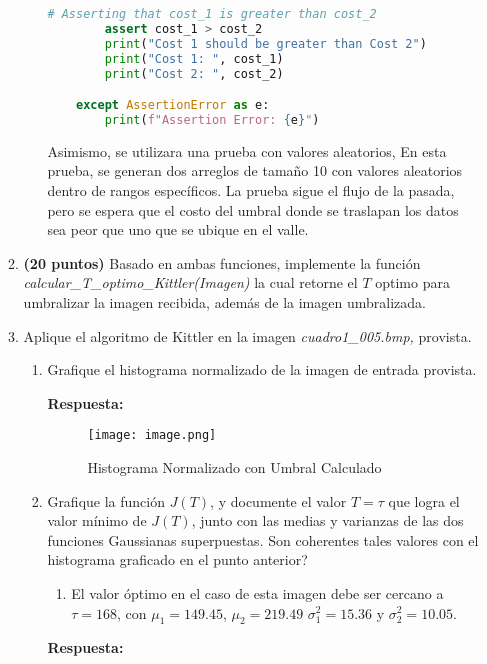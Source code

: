 \documentclass[spanish]{article}
\begin{document}
\begin{enumerate}
\begin{enumerate}
\begin{enumerate}
\begin{lstlisting}[language=Python, caption=Pruebas Unitarias]
        # Asserting that cost_1 is greater than cost_2
        assert cost_1 > cost_2
        print("Cost 1 should be greater than Cost 2")
        print("Cost 1: ", cost_1)
        print("Cost 2: ", cost_2)

    except AssertionError as e:
        print(f"Assertion Error: {e}")
\end{lstlisting}

\vspace{5px}

\par  Asimismo, se utilizara una prueba con valores aleatorios, En esta prueba, se generan dos arreglos de tamaño 10  con valores aleatorios dentro de rangos específicos. La prueba sigue el flujo de la pasada, pero se espera que el costo del umbral donde se traslapan los datos sea peor que uno que se ubique en el valle.

\newpage
\end{enumerate}
\item \textbf{(20 puntos)} Basado en ambas funciones, implemente la función
\emph{calcular\_T\_optimo\_Kittler(Imagen) }la cual retorne el $T$
optimo para umbralizar la imagen recibida, además de la imagen umbralizada. 
\item Aplique el algoritmo de Kittler en la imagen \emph{cuadro1\_005.bmp,
}provista.


\begin{enumerate}
\item Grafique el histograma normalizado de la imagen de entrada provista.
\par \textbf{Respuesta:}
\begin{figure}[h]
    \centering
    \texttt{[image: image.png]}
    \caption{Histograma Normalizado con Umbral Calculado}
    \label{fig:enter-label}
\end{figure}
\item Grafique la función $J(T)$, y documente el valor $T=\tau$ que logra
el valor mínimo de $J(T)$, junto con las medias y varianzas de las
dos funciones Gaussianas superpuestas. Son coherentes tales valores
con el histograma graficado en el punto anterior?
\begin{enumerate}
\item El valor óptimo en el caso de esta imagen debe ser cercano a $\tau=168$,
con $\mu_{1}=149.45$, $\mu_{2}=219.49$ $\sigma_{1}^{2}=15.36$ y
$\sigma_{2}^{2}=10.05$.
\end{enumerate}
\par \textbf{Respuesta:}


\end{enumerate}
\end{enumerate}
\end{enumerate}
\end{document}

